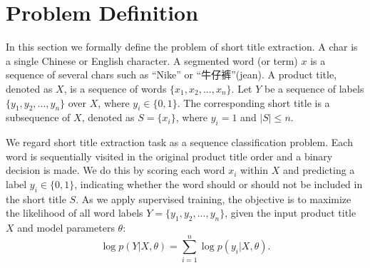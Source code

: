 \section{Problem Definition}
\label{sec:problem}

In this section we formally define the problem of short title extraction.
A char is a single Chinese or English character.
A segmented word (or term) $x$ is a sequence of several chars such as 
``Nike'' or ``牛仔裤''(jean).
A product title, denoted as $X$, is a sequence of words $\{x_1, x_2, ..., x_n\}$.
Let $Y$ be a sequence of labels $\{y_1, y_2, ..., y_n\}$ over $X$, where $y_i \in \{0, 1\}$.
The corresponding short title is a subsequence of $X$, denoted as $S = \{x_i\}$, 
where $y_i = 1$ and $|S| \le n$.


We regard short title extraction task as a sequence classification problem.
Each word is sequentially visited in the original product title order
and a binary decision is made.
We do this by scoring each word $x_i$ within $X$ and predicting a label $y_i \in \{0, 1\}$, 
indicating whether the word should or should not be included in the short title $S$.
As we apply supervised training, the objective is to maximize the likelihood of all word labels
$Y=\{y_1,y_2,...,y_n\}$, given the input product title $X$ and model parameters $\theta$:
\begin{equation}
\label{eqn:problem}
\log{p(Y|X,\theta)}=\sum_{i=1}^{n}{\log{p(y_i|X,\theta)}}.
\end{equation}



